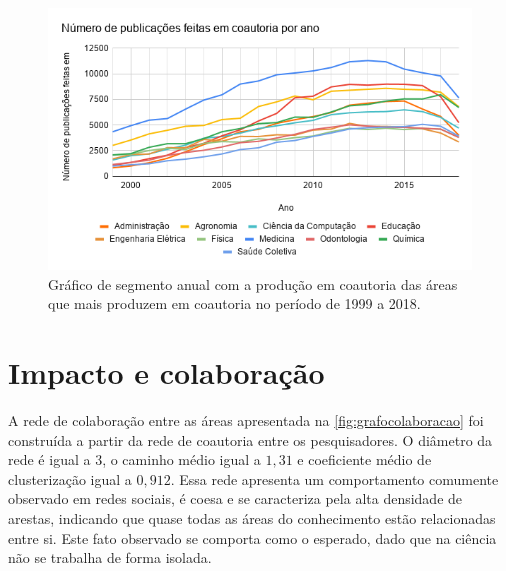 \begin{figure}[htpb]
  \centering
  \includegraphics[width=1\textwidth]{figuras/resultados-grafico-coautoria-anual}
  \caption{Gráfico de segmento anual com a produção em coautoria das áreas que mais produzem em coautoria no período de 1999 a 2018.}
  \label{fig:coautoriaanual}
\end{figure}

\section{Impacto e colaboração}

A rede de colaboração entre as áreas apresentada na \autoref{fig:grafocolaboracao} foi construída a partir da rede de coautoria entre os pesquisadores. O diâmetro da rede é igual a $3$, o caminho médio igual a $1,31$ e coeficiente médio de clusterização igual a $0,912$. Essa rede apresenta um comportamento comumente observado em redes sociais, é coesa e se caracteriza pela alta densidade de arestas, indicando que quase todas as áreas do conhecimento estão relacionadas entre si. Este fato observado se comporta como o esperado, dado que na ciência não se trabalha de forma isolada.

